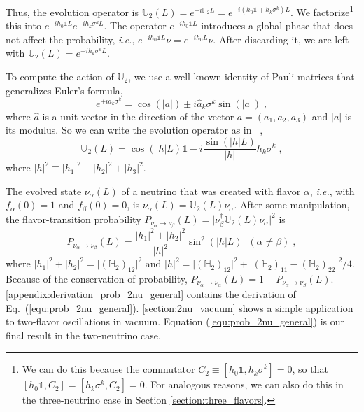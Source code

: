 \documentclass[final,5p,times,twocolumn]{elsarticle}
\newcommand{\ie}{{\it i.e.}}
\newcommand{\eq}{Eq.}
\providecommand{\Ref}{} %
\newcommand{\equ}[1]{\eq~(\ref{equ:#1})}
\begin{document}
Thus, the evolution operator is $\mathbb{U}_2\left(L\right) = e^{-i \mathbb{H}_2 L} = e^{-i(h_0 \mathbb{1}+h_k\sigma^k)L}$.  We factorize\footnote{We can do this because the commutator $C_2\equiv\left[h_0 \mathbb{1},h_k\sigma^k\right]=0$, so that $\left[h_0 \mathbb{1}, C_2\right]=\left[h_k\sigma^k, C_2\right]=0$.  For analogous reasons, we can also do this in the three-neutrino case in Section \ref{section:three_flavors}.} this into $e^{-ih_0\mathbb{1}L} e^{-ih_k\sigma^kL}$.  The operator $e^{-ih_0\mathbb{1}L}$ introduces a global phase that does not affect the probability, \ie, $e^{-ih_0\mathbb{1}L}\nu =e^{-ih_0L}\nu$.  After discarding it, we are left with $\mathbb{U}_2(L) =  e^{-ih_k\sigma^kL}$. 

To compute the action of $\mathbb{U}_2$, we use a well-known identity of Pauli matrices that generalizes Euler's formula,
\begin{equation}
 \label{equ:pauli_identity}
 e^{\pm i a_k \sigma^k}
 =
 \cos\left(\left\vert a \right\vert \right) 
 \pm 
 i \hat{a}_k\sigma^k\sin\left(\left\vert a\right\vert \right) \;, 
\end{equation}
where $\hat{a}$ is a unit vector in the direction of the vector $a = (a_1, a_2, a_3)$ and $\lvert a \rvert$ is its modulus.  So we can write the evolution operator as in \Ref\ \cite{Ohlsson:1999xb},
\begin{equation}
 \label{equ:evol_op_2nu}
 \mathbb{U}_2\left(L\right) 
 =
 \cos\left(\left\vert h\right\vert L\right) \mathbb{1}
 -
 i \frac{\sin\left(\left\vert h\right\vert L\right)}{\lvert h \rvert} h_k\sigma^k  \;,
\end{equation}
where $\lvert h \rvert^2 \equiv \lvert h_1 \rvert^2 + \lvert h_2 \rvert^2 + \lvert h_3 \rvert^2$.

The evolved state $\nu_\alpha (L)$ of a neutrino that was created with flavor $\alpha$, \ie, with $f_\alpha(0) = 1$ and $f_\beta(0) = 0$, is $\nu_\alpha\left(L\right) = \mathbb{U}_2(L) \nu_\alpha$.  After some manipulation, the flavor-transition probability $P_{\nu_\alpha \to \nu_\beta}(L) = \lvert \nu_\beta^\dagger \mathbb{U}_2(L) \nu_\alpha \rvert^2$ is
\begin{equation}
 \label{equ:prob_2nu_general}
 P_{\nu_\alpha \to \nu_\beta}(L)
 = \frac{\left\vert h_1 \right\vert^2 + \left\vert h_2 \right\vert^2}{\left\vert h\right\vert^2} \sin^2\left(\left\vert h\right\vert L\right) \;\; (\alpha \neq \beta) \;,
\end{equation}
where $\lvert h_1 \rvert^2 + \lvert h_2 \rvert^2 = \lvert (\mathbb{H}_2)_{12} \rvert^2$ and $\lvert h \rvert^2 = \lvert (\mathbb{H}_2)_{12} \rvert^2 + \lvert (\mathbb{H}_2)_{11} - (\mathbb{H}_2)_{22} \rvert^2 / 4$.  Because of the conservation of probability, $P_{\nu_\alpha \rightarrow \nu_\alpha}\left(L\right) = 1 - P_{\nu_\alpha \rightarrow \nu_\beta}\left(L\right)$.  \ref{appendix:derivation_prob_2nu_general} contains the derivation of \equ{prob_2nu_general}.  \ref{section:2nu_vacuum} shows a simple application to two-flavor oscillations in vacuum.  Equation (\ref{equ:prob_2nu_general}) is our final result in the two-neutrino case.  
\end{document}
